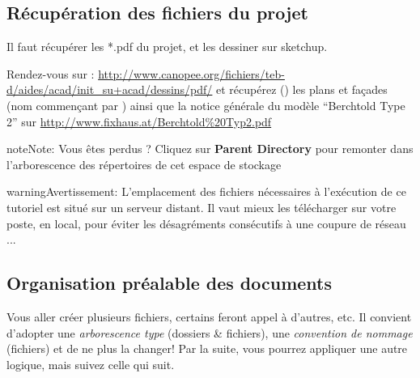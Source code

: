 \documentclass[a4paper,12pt,french]{sphinxmanual}
\begin{document}
\subsection{Récupération des fichiers du projet}
\label{init_su+acad/demarrage:recuperation-des-fichiers-du-projet}
Il faut récupérer les *.pdf du projet, et les dessiner sur sketchup.

Rendez-vous sur : \url{http://www.canopee.org/fichiers/teb-d/aides/acad/init\_su+acad/dessins/pdf/} et récupérez () les plans et façades (nom commençant par  ) ainsi que la notice générale du modèle ``Berchtold Type 2'' sur \url{http://www.fixhaus.at/Berchtold\%20Typ2.pdf}

\begin{notice}{note}{Note:}
Vous êtes perdus ? Cliquez sur \textbf{Parent Directory} pour remonter dans l'arborescence des répertoires de cet espace de stockage
\end{notice}

\begin{notice}{warning}{Avertissement:}
L'emplacement des fichiers nécessaires à l'exécution de ce tutoriel est situé sur un serveur distant. Il vaut mieux les télécharger sur votre poste, en local, pour éviter les désagréments consécutifs à une coupure de réseau ...
\end{notice}


\subsection{Organisation préalable des documents}
\label{init_su+acad/demarrage:organisation-prealable-des-documents}
Vous aller créer plusieurs fichiers, certains feront appel à d'autres, etc. Il convient d'adopter une \emph{arborescence type} (dossiers \& fichiers), une \emph{convention de nommage} (fichiers) et de ne plus la changer! Par la suite, vous pourrez appliquer une autre logique, mais suivez celle qui suit.
\end{document}

